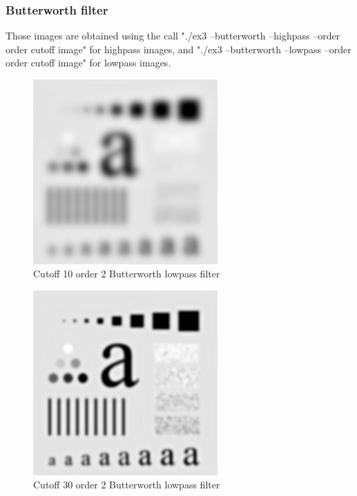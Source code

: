 \documentclass[10pt]{article}
\begin{document}
\subsubsection{Butterworth filter}
Those images are obtained using the call "./ex3 --butterworth --highpass --order order cutoff image" for highpass images, and "./ex3 --butterworth --lowpass --order order cutoff image" for lowpass images.
\begin{figure}[!ht]
	\centering
	\includegraphics[height=200pt]{./ex3/ch_butter_low_10.jpg}
	\caption{Cutoff 10 order 2 Butterworth lowpass filter}
\end{figure}
\begin{figure}[!ht]
	\centering
	\includegraphics[height=200pt]{./ex3/ch_butter_low_30.jpg}
	\caption{Cutoff 30 order 2 Butterworth lowpass filter}
\end{figure}
\end{document}
